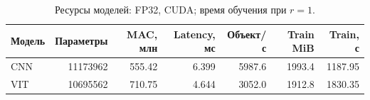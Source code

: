 \begin{table}[H]\centering\footnotesize
\setlength{\tabcolsep}{4pt}
\caption{Ресурсы моделей: FP32, CUDA; время обучения при $r=1$.}\label{tab:resources}
\begin{tabular}{lrrrrrr}
\toprule
Модель & Параметры & MAC, млн & Latency, мс & Объект/с & Train MiB & Train, с \\
\midrule
CNN & 11173962 & 555.42 & 6.399 & 5987.6 & 1993.4 & 1187.95 \\
VIT & 10695562 & 710.75 & 4.644 & 3052.0 & 1912.8 & 1830.35 \\
\bottomrule
\end{tabular}
\end{table}
